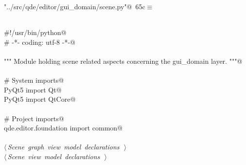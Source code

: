\documentclass[
    a4paper,      %
    10pt,         %
    openright,    %
    notitlepage,  %
    parskip=half, %
]{scrreprt}       %
\theoremstyle{definition}                    %
\begin{document}
\begin{flushleft} \small
\begin{minipage}{\linewidth}\label{scrap111}\raggedright\small
{} \verb@"../src/qde/editor/gui_domain/scene.py"@\nobreak\ {\footnotesize {65c}}$\equiv$
\vspace{-1ex}
\begin{list}{}{} \item
\mbox{}\lstinline@@\\
\mbox{}\lstinline@#!/usr/bin/python@\\
\mbox{}\lstinline@# -*- coding: utf-8 -*-@\\
\mbox{}\lstinline@@\\
\mbox{}\lstinline@""" Module holding scene related aspects concerning the gui_domain layer. """@\\
\mbox{}\lstinline@@\\
\mbox{}\lstinline@# System imports@\\
\mbox{}\lstinline@from PyQt5 import Qt@\\
\mbox{}\lstinline@from PyQt5 import QtCore@\\
\mbox{}\lstinline@@\\
\mbox{}\lstinline@# Project imports@\\
\mbox{}\lstinline@from qde.editor.foundation import common@\\
\mbox{}\lstinline@@\\
\mbox{}\lstinline@@\hbox{$\langle\,${\itshape Scene graph view model declarations}\nobreak\ {\footnotesize {}}$\,\rangle$}\lstinline@@\\
\mbox{}\lstinline@@\hbox{$\langle\,${\itshape Scene view model declarations}\nobreak\ {\footnotesize {}}$\,\rangle$}\lstinline@@\\
\mbox{}\lstinline@@{\NWsep}
\end{list}
\vspace{-1.5ex}
\footnotesize
\begin{list}{}{\setlength{\itemsep}{-\parsep}\setlength{\itemindent}{-\leftmargin}}

\item{}
\end{list}
\end{minipage}\vspace{4ex}
\end{flushleft}
\end{document}
